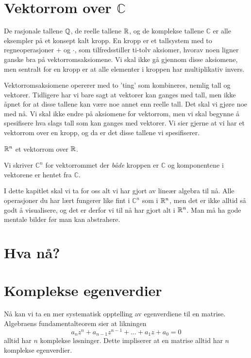 

\label{ch:kompleks-linear-algebra}

\section*{Vektorrom over $\mathbb C$}

De rasjonale tallene $\mathbb{Q}$, de reelle tallene $\mathbb{R}$, og de komplekse tallene $\mathbb C$ er alle eksempler på et konsept kalt kropp. En kropp er et tallsystem med to regneoperasjoner $+$ og $\cdot$, som tilfredsstiller ti-tolv aksiomer, hvorav noen ligner ganske bra på vektorromsaksiomene. Vi skal ikke gå gjennom disse aksiomene, men sentralt for en kropp er at alle elementer i kroppen har multiplikativ invers.

Vektorromsaksiomene opererer med to 'ting' som kombineres, nemlig tall og vektorer. Tidligere har vi bare sagt at vektorer kan ganges med tall, men ikke åpnet for at disse tallene kan være noe annet enn reelle tall. Det skal vi gjøre noe med nå. Vi skal ikke endre på aksiomene for vektorrom, men vi skal begynne å spesifisere hva slags tall som kan ganges med vektorer. Vi sier gjerne at vi har et vektorrom over en kropp, og da er det disse tallene vi spesifiserer. 
\begin{ex}
$\mathbb{R}^n$ et vektorrom over $\mathbb{R}$.
\end{ex}
\begin{ex}
Vi skriver $\mathbb C^n$ for vektorrommet der \emph{både} kroppen er $\mathbb C$ og komponentene i vektorene er hentet fra $\mathbb C$.
\end{ex}
I dette kapitlet skal vi ta for oss alt vi har gjort av lineær algebra til nå. Alle operasjoner du har lært fungerer like fint i $\mathbb C^n$ som i $\mathbb{R}^n$, men det er ikke alltid så godt å visualisere, og det er derfor vi til nå har gjort alt i $\mathbb{R}^n$. Man må ha gode mentale bilder før man kan abstrahere.

\section*{Hva nå?}

\section*{Komplekse egenverdier}
Nå kan vi ta en mer systematisk opptelling av egenverdiene til en matrise. Algebraens fundamentalteorem sier at likningen
\[
a_nz^n+a_{n-1}z^{n-1}+...+a_1z+a_0=0
\]
alltid har $n$ komplekse løsninger. Dette impliserer at en matrise alltid har $n$ komplekse egenverdier.


\kapittelslutt
